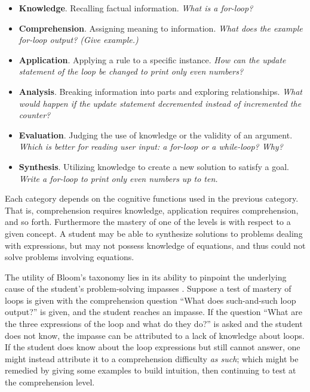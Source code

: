 \documentclass[]{interact}
\theoremstyle{plain}
\theoremstyle{definition}
\theoremstyle{remark}
\begin{document}
\begin{itemize}

\item \textbf{Knowledge}. Recalling factual information.  \emph{What is a
for-loop?}

\item \textbf{Comprehension}. Assigning meaning to information.  \emph{What
does the example for-loop output? (Give example.)}

\item \textbf{Application}. Applying a rule to a specific instance.  \emph{How
can the update statement of the loop be changed to print only even numbers?}

\item \textbf{Analysis}. Breaking information into parts and exploring
relationships.  \emph{What would happen if the update statement decremented
instead of incremented the counter?}

\item \textbf{Evaluation}. Judging the use of knowledge or the validity of an
argument.  \emph{Which is better for reading user input: a for-loop or a
while-loop? Why?}

\item \textbf{Synthesis}. Utilizing knowledge to create a new solution to
satisfy a goal.  \emph{Write a for-loop to print only even numbers up to ten.}

\end{itemize}

Each category depends on the cognitive functions used in the previous category.
That is, comprehension requires knowledge, application requires comprehension,
and so forth.  Furthermore the mastery of one of the levels is with respect to
a given concept.  A student may be able to synthesize solutions to problems
dealing with expressions, but may not possess knowledge of equations, and thus
could not solve problems involving equations.

The utility of Bloom's taxonomy lies in its ability to pinpoint the underlying
cause of the student's problem-solving impasses \citep{shuhidan2011}.  Suppose a
test of mastery of loops is given with the comprehension question ``What does
such-and-such loop output?'' is given, and the student reaches an impasse.  If
the question ``What are the three expressions of the loop and what do they
do?'' is asked and the student does not know, the impasse can be attributed to
a lack of knowledge about loops.  If the student does know about the loop
expressions but still cannot answer, one might instead attribute it to a
comprehension difficulty \emph{as such}; which might be remedied by giving some
examples to build intuition, then continuing to test at the comprehension
level.
\end{document}
